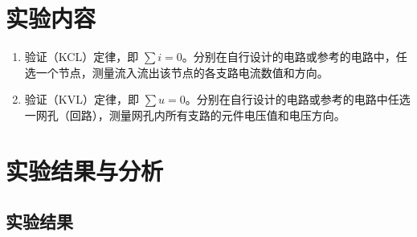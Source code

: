 \documentclass[a4paper,utf8]{article}
\begin{document}
\section{实验内容}
\begin{enumerate}
    \item 验证（KCL）定律，即 $\sum i=0$。分别在自行设计的电路或参考的电路中，任选一个节点，测量流入流出该节点的各支路电流数值和方向。
    \item 验证（KVL）定律，即 $\sum u=0$。分别在自行设计的电路或参考的电路中任选一网孔（回路），测量网孔内所有支路的元件电压值和电压方向。
\end{enumerate}
\section{实验结果与分析}
\subsection{实验结果}
\end{document}
